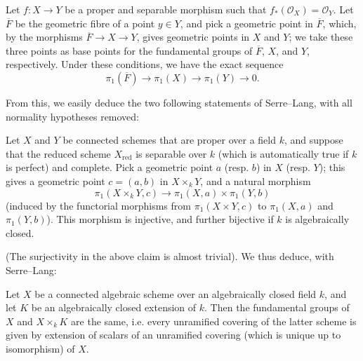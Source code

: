 \documentclass{article}
\theoremstyle{plain}
\newenvironment{corollary}[1]
  {\renewcommand\theinnercustomcorollary{#1}\innercustomcorollary}
  {\endinnercustomcorollary}
\theoremstyle{definition}
\newcommand{\sh}[1]{{\mathscr{#1}}}
\newcommand{\red}{\mathrm{red}}
\begin{document}
\begin{corollary}{4}
\label{theorem11corollary4}
  Let $f\colon X\to Y$ be a proper and separable morphism such that $f_*(\sh{O}_X)=\sh{O}_Y$.
  Let $\overline{F}$ be the geometric fibre of a point $y\in Y$, and pick a geometric point in $\overline{F}$, which, by the morphisms $\overline{F}\to X\to Y$, gives geometric points in $X$ and $Y$; we take these three points as base points for the fundamental groups of $\overline{F}$, $X$, and $Y$, respectively.
  Under these conditions, we have the exact sequence
  \[
    \boxed{\pi_1(\overline{F}) \to \pi_1(X) \to \pi_1(Y) \to 0.}
  \]
\end{corollary}

From this, we easily deduce the two following statements of Serre--Lang, with all normality hypotheses removed:

\begin{corollary}{5}
\label{theorem11corollary5}
  Let $X$ and $Y$ be connected schemes that are proper over a field $k$, and suppose that the reduced scheme $X_\red$ is separable over $k$ (which is automatically true if $k$ is perfect) and complete.
  Pick a geometric point $a$ (resp. $b$) in $X$ (resp. $Y$); this gives a geometric point $c=(a,b)$ in $X\times_kY$, and a natural morphism
  \[
    \pi_1(X\times_kY,c) \to \pi_1(X,a)\times\pi_1(Y,b)
  \]
  (induced by the functorial morphisms from $\pi_1(X\times Y,c)$ to $\pi_1(X,a)$ and $\pi_1(Y,b)$).
  This morphism is injective, and further bijective if $k$ is algebraically closed.
\end{corollary}

(The surjectivity in the above claim is almost trivial).
We thus deduce, with Serre--Lang:

\begin{corollary}{6}
\label{theorem11corollary6}
  Let $X$ be a connected algebraic scheme over an algebraically closed field $k$, and let $K$ be an algebraically closed extension of $k$.
  Then the fundamental groups of $X$ and $X\times_kK$ are the same, i.e. every unramified covering of the latter scheme is given by extension of scalars of an unramified covering (which is unique up to isomorphism) of $X$.
\end{corollary}
\end{document}
